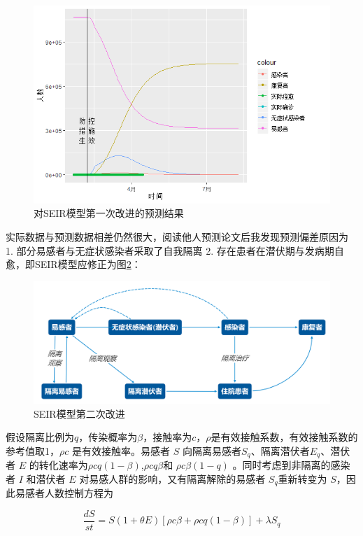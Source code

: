 \documentclass[a4paper, 11pt,twoside=true,UTF8]{scrartcl}
\begin{document}
\begin{figure}[H]
	\small
	\centering
	\includegraphics[width=15cm]{P3F7}
	\caption{对SEIR模型第一次改进的预测结果} \label{P3F7}
\end{figure}

实际数据与预测数据相差仍然很大，阅读他人预测论文后我发现预测偏差原因为 1. 部分易感者与无症状感染者采取了自我隔离 2. 存在患者在潜伏期与发病期自愈，即SEIR模型应修正为图\ref{C5}：

\begin{figure}[H]
	\small
	\centering
	\includegraphics[width=14cm]{C5}
	\caption{SEIR模型第二次改进} \label{C5}
\end{figure}

假设隔离比例为$q$，传染概率为$\beta$，接触率为$c$，$\rho$是有效接触系数，有效接触系数的参考值取1，$\rho  c$ 是有效接触率。易感者 $S$ 向隔离易感者$S_q$、隔离潜伏者$E_q$、潜伏者 $E$ 的转化速率为$\rho c q(1-\beta)$,$\rho c q \beta$和 $\rho c \beta (1-q)$ 。同时考虑到非隔离的感染者 $I$ 和潜伏者 $E$ 对易感人群的影响，又有隔离解除的易感者 $S_q$重新转变为 $S$，因此易感者人数控制方程为

$$
\frac{dS}{st}=S(1+\theta E)\left[ \rho c \beta + \rho cq(1-\beta) \right]+\lambda S_q
$$
\end{document}
